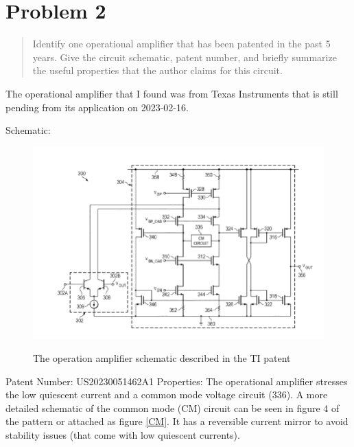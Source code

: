 \documentclass[10pt,a4paper]{article}
\begin{document}
\section{Problem 2}
\begin{quote}
Identify one operational amplifier that has been patented in
the past 5 years. Give the circuit schematic, patent number, and briefly
summarize the useful properties that the author claims for this circuit.

\end{quote}

The operational amplifier that I found was from Texas Instruments that is still pending from its application on 2023-02-16.



Schematic:\\
\begin{figure}[H]
\centering
\includegraphics[width=6in]{images/TIOpAmpSchematic.png} \\
\caption{The operation amplifier schematic described in the TI patent\cite{patent}}
\end{figure}
Patent Number: US20230051462A1
Properties: The operational amplifier stresses the low quiescent current and a common mode voltage circuit (336). A more detailed schematic of the common mode (CM) circuit can be seen in figure 4 of the pattern or attached as figure \ref{CM}. It has a reversible current mirror to avoid stability issues (that come with low quiescent currents).
\end{document}
